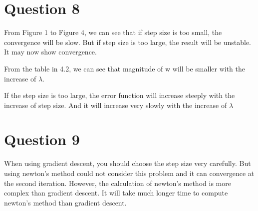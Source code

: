 \documentclass[11pt]{article}
\numberwithin{equation}{section}
\begin{document}
\section{Question 8}
	From Figure 1 to Figure 4, we can see that if step size is too small, the convergence will be slow. But if step size is too large, the result will be unstable. It may now show convergence.
	
	From the table in 4.2, we can see that magnitude of w will be smaller with the increase of $\lambda$.
	
	If the step size is too large, the error function will increase steeply with the increase of step size. And it will increase very slowly with the increase of $\lambda$
	
\section{Question 9}
	When using gradient descent, you should choose the step size very carefully. But using newton's method could not consider this problem and it can convergence at the second iteration. However, the calculation of newton's method is more complex than gradient descent. It will take much longer time to compute newton's method than gradient descent.
\end{document}
